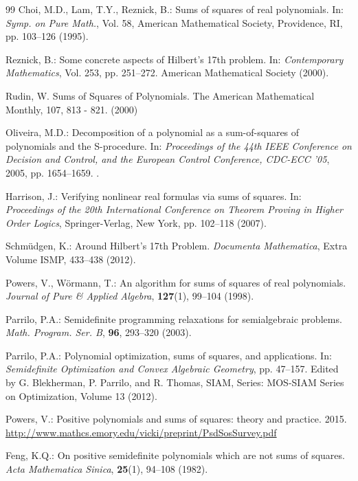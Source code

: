 \documentclass[runningheads]{llncs}
\begin{document}
{\begin{thebibliography}{99}
	Choi, M.D., Lam, T.Y., Reznick, B.: Sums of squares of real polynomials. In: \textit{ Symp. on Pure Math.}, Vol. 58, American Mathematical Society, Providence, RI, pp. 103--126 (1995).
	
	Reznick, B.: Some concrete aspects of Hilbert's 17th problem. In: \textit{ Contemporary Mathematics}, Vol. 253, pp. 251--272. American Mathematical Society (2000).
	
	Rudin, W.  Sums of Squares of Polynomials. The American Mathematical Monthly, 107, 813 - 821. (2000)
	
	Oliveira, M.D.: Decomposition of a polynomial as a sum-of-squares of polynomials and the S-procedure. In: \textit{ Proceedings of the 44th IEEE Conference on Decision and Control, and the European Control Conference, CDC-ECC '05}, 2005, pp. 1654--1659. .
	
	Harrison, J.: Verifying nonlinear real formulas via sums of squares. In: \textit{ Proceedings of the 20th International Conference on Theorem Proving in Higher Order Logics}, Springer-Verlag, New York, pp. 102--118 (2007).
	
	Schm\"{u}dgen, K.: Around Hilbert's 17th Problem. \textit{ Documenta Mathematica}, Extra Volume ISMP, 433--438 (2012).
	
	Powers, V., W\"{o}rmann, T.: An algorithm for sums of squares of real polynomials. \textit{ Journal of Pure \& Applied Algebra}, \textbf{127}(1), 99--104 (1998).
	
	Parrilo, P.A.: Semidefinite programming relaxations for semialgebraic problems. \textit{ Math. Program. Ser. B}, \textbf{96}, 293--320 (2003).
	
	Parrilo, P.A.: Polynomial optimization, sums of squares, and applications. In: \textit{ Semidefinite Optimization and Convex Algebraic Geometry}, pp. 47--157. Edited by G. Blekherman, P. Parrilo, and R. Thomas, SIAM, Series: MOS-SIAM Series on Optimization, Volume 13 (2012).
	
	Powers, V.: Positive polynomials and sums of squares: theory and practice. 2015. \url{http://www.mathcs.emory.edu/vicki/preprint/PsdSosSurvey.pdf}
	
	Feng, K.Q.: On positive semidefinite polynomials which are not sums of squares. \textit{ Acta Mathematica Sinica}, \textbf{25}(1), 94--108 (1982). %
	

\end{thebibliography}}
\end{document}
